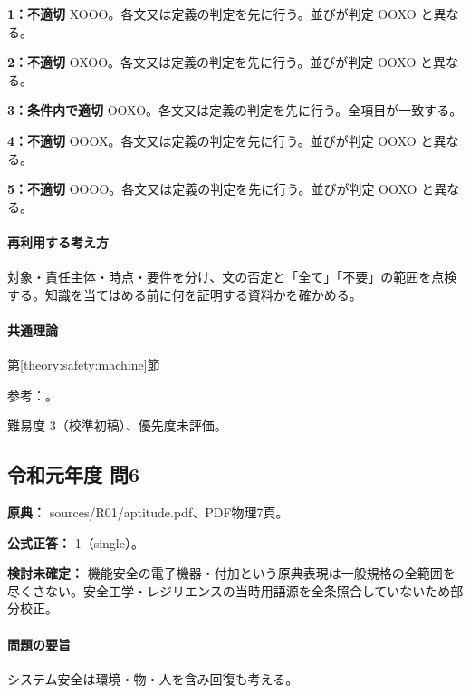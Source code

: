 \noindent\textbf{1：不適切} XOOO。各文又は定義の判定を先に行う。並びが判定 OOXO と異なる。\par

\noindent\textbf{2：不適切} OXOO。各文又は定義の判定を先に行う。並びが判定 OOXO と異なる。\par

\noindent\textbf{3：条件内で適切} OOXO。各文又は定義の判定を先に行う。全項目が一致する。\par

\noindent\textbf{4：不適切} OOOX。各文又は定義の判定を先に行う。並びが判定 OOXO と異なる。\par

\noindent\textbf{5：不適切} OOOO。各文又は定義の判定を先に行う。並びが判定 OOXO と異なる。\par

\paragraph{再利用する考え方} 対象・責任主体・時点・要件を分け、文の否定と「全て」「不要」の範囲を点検する。知識を当てはめる前に何を証明する資料かを確かめる。

\paragraph{共通理論} \hyperref[theory:safety:machine]{第\ref*{theory:safety:machine}節}

\par 参考：\cite{saf53_machine2007}。

\par 難易度 3（校準初稿）、優先度未評価。

\subsection{令和元年度 問6}
\label{q:r01-reg-apt-06}

\noindent\textbf{原典：} sources/R01/aptitude.pdf、PDF物理7頁。

\textbf{公式正答：} 1（single）。

\par\textbf{検討未確定：} 機能安全の電子機器・付加という原典表現は一般規格の全範囲を尽くさない。安全工学・レジリエンスの当時用語源を全条照合していないため部分校正。

\paragraph{問題の要旨} システム安全は環境・物・人を含み回復も考える。

